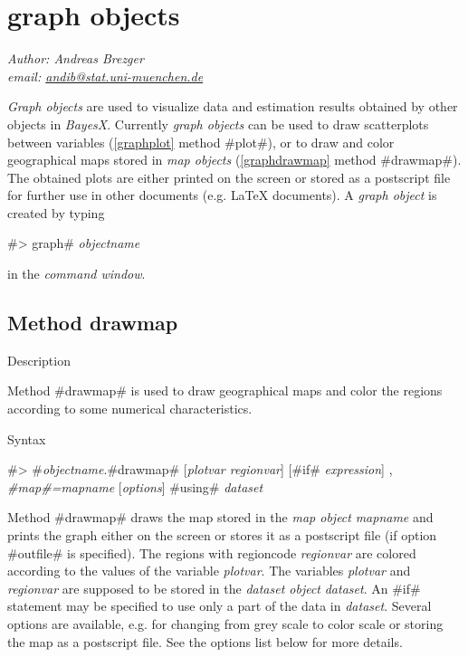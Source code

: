 \chapter{graph objects}
\label{graphobj}  

{\em Author: Andreas Brezger} \\
{\em email: \href{mailto:andib@stat.uni-muenchen.de}{andib@stat.uni-muenchen.de}}\\
\vspace{0.3cm}


{\em Graph objects} are used to visualize data and estimation
results obtained by other objects in {\em BayesX}. Currently {\em
graph objects} can be used to draw scatterplots between variables
(\autoref{graphplot} method #plot#), or to draw and color
geographical maps stored in {\em map objects}
(\autoref{graphdrawmap} method #drawmap#). The obtained plots are
either printed on the screen or stored as a postscript file for
further use in other documents (e.g. \LaTeX\/ documents).
A {\em graph object} is created by typing

#> graph# {\em objectname}

in the {\em command window}.



\clearpage



\section{Method drawmap}
\label{graphdrawmap} 

\begin{stanza}{Description}

{Method #drawmap# is used to draw geographical maps and color the
regions according to some numerical characteristics.}
\end{stanza}

\begin{stanza}{Syntax}

{#> #{\em objectname}.#drawmap#  [{\em plotvar regionvar}]
[#if# {\em expression}] , {\em #map#=mapname} [{\em options}] #using# {\em dataset}

Method #drawmap# draws the map stored in the {\em map object} {\em
mapname} and prints the graph either on the screen or stores it as
a postscript file (if option #outfile# is specified). The regions
with regioncode {\em regionvar} are colored according to the
values of the variable {\em plotvar}. The variables {\em plotvar}
and {\em regionvar} are supposed to be stored in the {\em dataset
object} {\em dataset}. An #if# statement may be specified to use
only a part of the data in {\em dataset}. Several options are
available, e.g. for changing from grey scale to color scale or
storing the map as a postscript file. See the options list below
for more details.}
\end{stanza}

